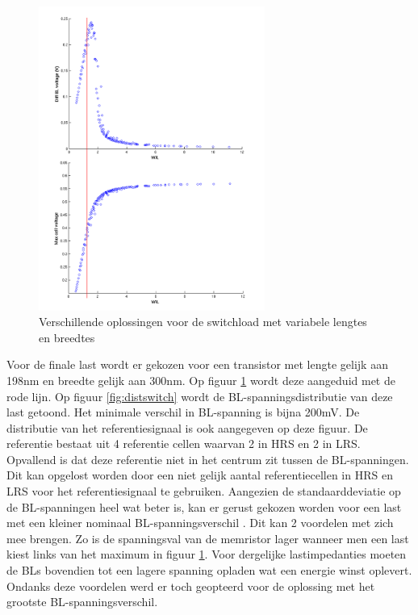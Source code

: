 \begin{figure}[!ht]
  \centering
  \includegraphics[width=0.66\textwidth]{../fig/hfdst-last-length.png}
  \caption{Verschillende oplossingen voor de switchload met variabele lengtes en breedtes}
  \label{fig:length}
\end{figure}

Voor de finale last wordt er gekozen voor een transistor met lengte gelijk aan 198nm en breedte gelijk aan 300nm. Op figuur \ref{fig:length} wordt deze aangeduid met de rode lijn. Op figuur \ref{fig:distswitch} wordt de BL-spanningsdistributie van deze last getoond. Het minimale verschil in BL-spanning is bijna 200mV. De distributie van het referentiesignaal is ook aangegeven op deze figuur. De referentie bestaat uit 4 referentie cellen waarvan 2 in HRS en 2 in LRS. Opvallend is dat deze referentie niet in het centrum zit tussen de BL-spanningen. Dit kan opgelost worden door een niet gelijk aantal referentiecellen in HRS en LRS voor het referentiesignaal te gebruiken. Aangezien de standaarddeviatie op de BL-spanningen heel wat beter is, kan er gerust gekozen worden voor een last met een kleiner nominaal BL-spanningsverschil \label{anderelast}. Dit kan 2 voordelen met zich mee brengen. Zo is de spanningsval van de memristor lager wanneer men een last kiest links van het maximum in figuur \ref{fig:length}. Voor dergelijke lastimpedanties moeten de BLs bovendien tot een lagere spanning opladen wat een energie winst oplevert. Ondanks deze voordelen werd er toch geopteerd voor de oplossing met het grootste BL-spanningsverschil.

